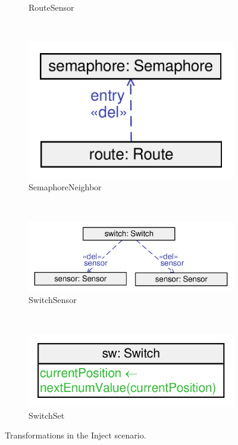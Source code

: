 \begin{figure}
\begin{subfigure}[b]{0.6\textwidth}
                \caption{\textsf{RouteSensor}}
                \label{fig:transformation-inject-routesensor}
        \end{subfigure}
        ~
        \begin{subfigure}[b]{0.4\textwidth}
                \centering
                \includegraphics[scale=0.4]{figures/transformation-inject-semaphoreneighbor}
                \caption{\textsf{SemaphoreNeighbor}}
                \label{fig:transformation-inject-semaphoreneighbor}
        \end{subfigure}%
        ~
        \begin{subfigure}[b]{0.6\textwidth}
                \centering
                \includegraphics[scale=0.4]{figures/transformation-inject-switchsensor}
                \caption{\textsf{SwitchSensor}}
                \label{fig:transformation-inject-switchsensor}
        \end{subfigure}
        ~
        \begin{subfigure}[b]{0.6\textwidth}
                \centering
                \includegraphics[scale=0.4]{figures/transformation-inject-switchset}
                \caption{\textsf{SwitchSet}}
                \label{fig:transformation-inject-switchset}
        \end{subfigure}
        \caption{Transformations in the \textsf{Inject} scenario.}
        \label{fig:transformations-repair}
\end{figure}


